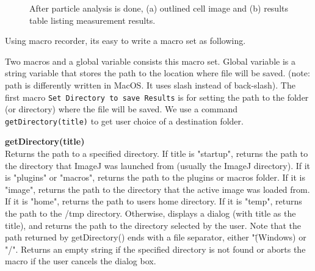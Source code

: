 \documentclass[11pt,a4paper,oneside]{report}
\newenvironment{indentCom}%
{\begin{list}{}%
         {\setlength{\leftmargin}{1em}}%
         \item[]%
}
{\end{list}}
\newcommand{\ilcom}[1]{\texttt{\small#1}}
\begin{document}
\begin{figure}[htbp]
 \centering
 \caption{ After particle analysis is done, (a) outlined cell image and (b) results table listing measurement results.}
 \label{fig:ParticleAnalysisResults}
\end{figure}

Using macro recorder, its easy to write a macro set as following. 



Two macros and a global variable consists this macro set. Global variable is a string variable that stores the path to the location where file will be saved. (note: path is differently written in MacOS. It uses slash instead of back-slash). The first macro \ilcom{Set Directory to save Results} is for setting the path to the folder (or directory) where the file will be saved. We use a command \ilcom{getDirectory(title)} to get user choice of a destination folder. 

\begin{indentCom}
\textbf{getDirectory(title)}\\
Returns the path to a specified directory. If title is "startup", returns the path to the directory that ImageJ was launched from (usually the ImageJ directory). If it is "plugins" or "macros", returns the path to the plugins or macros folder. If it is "image", returns the path to the directory that the active image was loaded from. If it is "home", returns the path to users home directory. If it is "temp", returns the path to the /tmp directory. Otherwise, displays a dialog (with title as the title), and returns the path to the directory selected by the user. Note that the path returned by getDirectory() ends with a file separator, either "\" (Windows) or "/". Returns an empty string if the specified directory is not found or aborts the macro if the user cancels the dialog box.
\end{indentCom}
\end{document}

